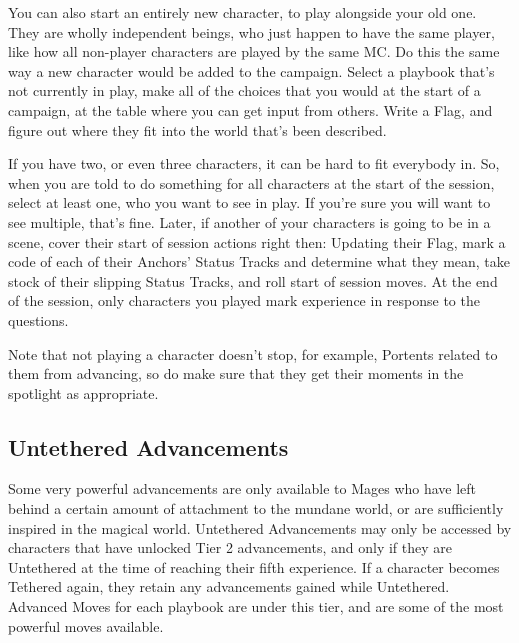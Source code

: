 \documentclass[
  oneside,
  statementpaper,
  9pt]{memoir}
\begin{document}
\begin{Player}

You can also start an entirely new character, to play alongside your old one. They are wholly independent beings, who just happen to have the same player, like how all non-player characters are played by the same MC. Do this the same way a new character would be added to the campaign. Select a playbook that’s not currently in play, make all of the choices that you would at the start of a campaign, at the table where you can get input from others. Write a Flag, and figure out where they fit into the world that’s been described.

If you have two, or even three characters, it can be hard to fit everybody in. So, when you are told to do something for all characters at the start of the session, select at least one, who you want to see in play. If you’re sure you will want to see multiple, that’s fine. Later, if another of your characters is going to be in a scene, cover their start of session actions right then: Updating their Flag, mark a code of each of their Anchors’ Status Tracks and determine what they mean, take stock of their slipping Status Tracks, and roll start of session moves. At the end of the session, only characters you played mark experience in response to the questions.

Note that not playing a character doesn’t stop, for example, Portents related to them from advancing, so do make sure that they get their moments in the spotlight as appropriate.

\end{Player}

\hypertarget{untethered-advancements-1}{%
\subsection{Untethered Advancements}\label{untethered-advancements-1}}

\begin{Player}

Some very powerful advancements are only available to Mages who have left behind a certain amount of attachment to the mundane world, or are sufficiently inspired in the magical world. Untethered Advancements may only be accessed by characters that have unlocked Tier 2 advancements, and only if they are Untethered at the time of reaching their fifth experience. If a character becomes Tethered again, they retain any advancements gained while Untethered. Advanced Moves for each playbook are under this tier, and are some of the most powerful moves available.

\end{Player}
\end{document}
